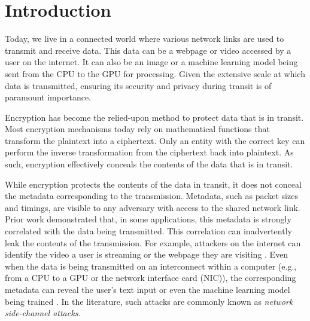 
\chapter{Introduction}
\label{ch:Introduction}

Today, we live in a connected world where various network links are used to transmit and receive data. 
This data can be a webpage or video accessed by a user on the internet. 
It can also be an image or a machine learning model being sent from the CPU to the GPU for processing. 
Given the extensive scale at which data is transmitted, ensuring its security and privacy during transit is of paramount importance.


Encryption has become the relied-upon method to protect data that is in transit.
Most encryption mechanisms today rely on mathematical functions that transform the plaintext into a ciphertext. 
Only an entity with the correct key can perform the inverse transformation from the ciphertext back into plaintext. 
As such, encryption effectively conceals the contents of the data that is in transit.

While encryption protects the contents of the data in transit, it does not conceal the metadata corresponding to the transmission.
Metadata, such as packet sizes and timings, are visible to any adversary with access to the shared network link.
Prior work demonstrated that, in some applications, this metadata is strongly correlated with the data being transmitted.
This correlation can inadvertently leak the contents of the transmission.
For example, attackers on the internet can identify the video a user is streaming \cite{schuster2017beautyburst} or the webpage they are visiting \cite{gong2010fingerprinting, wang2014supersequence}.
Even when the data is being transmitted on an interconnect within a computer (e.g., from a CPU to a GPU or the network interface card (NIC)), the corresponding metadata can reveal the user's text input or even the machine learning model being trained \cite{tan2021invisible}.
In the literature, such attacks are commonly known as \textit{network side-channel attacks}.

